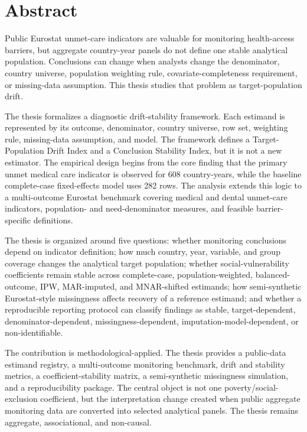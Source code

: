 \chapter*{Abstract}

Public Eurostat unmet-care indicators are valuable for monitoring health-access barriers, but aggregate country-year panels do not define one stable analytical population. Conclusions can change when analysts change the denominator, country universe, population weighting rule, covariate-completeness requirement, or missing-data assumption. This thesis studies that problem as target-population drift.

The thesis formalizes a diagnostic drift-stability framework. Each estimand is represented by its outcome, denominator, country universe, row set, weighting rule, missing-data assumption, and model. The framework defines a Target-Population Drift Index and a Conclusion Stability Index, but it is not a new estimator. The empirical design begins from the core finding that the primary unmet medical care indicator is observed for 608 country-years, while the baseline complete-case fixed-effects model uses 282 rows. The analysis extends this logic to a multi-outcome Eurostat benchmark covering medical and dental unmet-care indicators, population- and need-denominator measures, and feasible barrier-specific definitions.

The thesis is organized around five questions: whether monitoring conclusions depend on indicator definition; how much country, year, variable, and group coverage changes the analytical target population; whether social-vulnerability coefficients remain stable across complete-case, population-weighted, balanced-outcome, IPW, MAR-imputed, and MNAR-shifted estimands; how semi-synthetic Eurostat-style missingness affects recovery of a reference estimand; and whether a reproducible reporting protocol can classify findings as stable, target-dependent, denominator-dependent, missingness-dependent, imputation-model-dependent, or non-identifiable.

The contribution is methodological-applied. The thesis provides a public-data estimand registry, a multi-outcome monitoring benchmark, drift and stability metrics, a coefficient-stability matrix, a semi-synthetic missingness simulation, and a reproducibility package. The central object is not one poverty/social-exclusion coefficient, but the interpretation change created when public aggregate monitoring data are converted into selected analytical panels. The thesis remains aggregate, associational, and non-causal.
